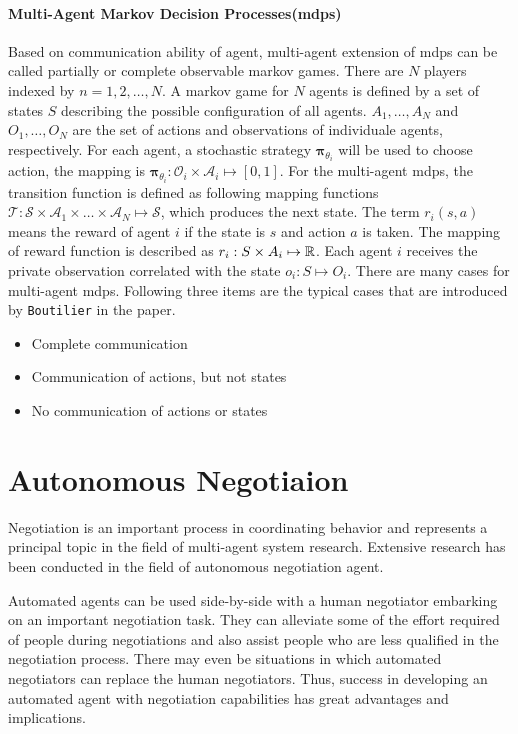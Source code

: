 \paragraph{Multi-Agent Markov Decision Processes(\gls{mdps})} Based on communication ability of agent, multi-agent extension of \gls{mdps} can be called partially or complete observable markov games. There are $N$ players indexed by $n=1,2, \dots ,N$. A markov game for $N$ agents is defined by a set of states $S$ describing the possible configuration of all agents. $A_1, \dots, A_N$ and $O_1, \dots, O_N$ are the set of actions and observations of individuale agents, respectively. For each agent, a stochastic strategy $\boldsymbol{\pi}_{\theta_{i}}$ will be used to choose action, the mapping is $\boldsymbol{\pi}_{\theta_{i}}: \mathcal{O}_{i} \times \mathcal{A}_{i} \mapsto[0,1]$. For the multi-agent \gls{mdps}, the transition function is defined as following mapping functions $\mathcal{T}: \mathcal{S} \times \mathcal{A}_{1} \times \ldots \times \mathcal{A}_{N} \mapsto \mathcal{S}$, which produces the next state. The term $r_i(s, a)$ means the reward of agent $i$ if the state is $s$ and action $a$ is taken. The mapping of reward function is described as $r_i: S \times A_i \mapsto \mathbb{R}$. Each agent $i$ receives the private observation correlated with the state $o_i: S \mapsto O_i$\parencite{maddpg2017}. There are many cases for multi-agent \gls{mdps}. Following three items are the typical cases that are introduced by \texttt{Boutilier} in the paper\parencite{Boutilier1996PlanningLA}.
\begin{itemize}
\item Complete communication
\item Communication of actions, but not states 
\item No communication of actions or states
\end{itemize}

\section{Autonomous Negotiaion} \label{autonomous-negotiation}
Negotiation is an important process in coordinating behavior and represents a principal topic in the field of multi-agent system research. Extensive research has been conducted in the field of autonomous negotiation agent.

Automated agents can be used side-by-side with a human negotiator embarking on an important negotiation task. They can alleviate some of the effort required of people during negotiations and also assist people who are less qualified in the negotiation process. There may even be situations in which automated negotiators can replace the human negotiators. Thus, success in developing an automated agent with negotiation capabilities has great advantages and implications\parencite{Baarslag2012}.

